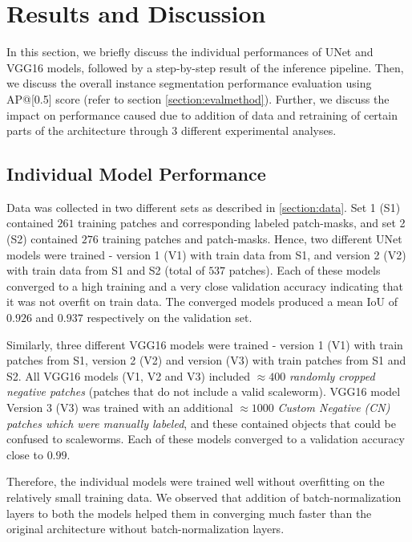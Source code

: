 \documentclass[10pt,twocolumn,letterpaper]{article}
\begin{document}
\section{Results and Discussion}
In this section, we briefly discuss the individual performances of UNet and VGG16 models, followed by a step-by-step result of the inference pipeline. Then, we discuss the overall instance segmentation performance evaluation using AP@[0.5] score (refer to section \ref{section:evalmethod}). Further, we discuss the impact on performance caused due to addition of data and retraining of certain parts of the architecture through 3 different experimental analyses.

\subsection{Individual Model Performance}
Data was collected in two different sets as described in \ref{section:data}. Set 1 (S1) contained $261$ training patches and corresponding labeled patch-masks, and set 2 (S2) contained $276$ training patches and patch-masks. Hence, two different UNet models were trained - version 1 (V1) with train data from S1, and version 2 (V2) with train data from S1 and S2 (total of $537$ patches). Each of these models converged to a high training and a very close validation accuracy indicating that it was not overfit on train data. The converged models produced a mean IoU of $0.926$ and $0.937$ respectively on the validation set.

Similarly, three different VGG16 models were trained - version 1 (V1) with train patches from S1, version 2 (V2) and version (V3) with train patches from S1 and S2. All VGG16 models (V1, V2 and V3) included $\approx 400$ \textit{randomly cropped negative patches} (patches that do not include a valid scaleworm). VGG16 model Version 3 (V3) was trained with an additional $\approx 1000$ \textit{Custom Negative (CN) patches which were manually labeled}, and these contained objects that could be confused to scaleworms. Each of these models converged to a validation accuracy close to $0.99$.

Therefore, the individual models were trained well without overfitting on the relatively small training data. We observed that addition of batch-normalization layers to both the models helped them in converging much faster than the original architecture without batch-normalization layers.
\end{document}
